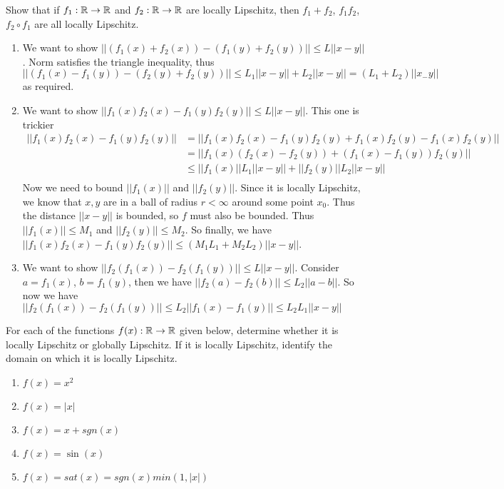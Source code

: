 \documentclass[11pt]{article}
\begin{document}
Show that if $f_1: \mathbb{R} \to \mathbb{R}$ and $f_2: \mathbb{R} \to \mathbb{R}$ are locally Lipschitz,
then $f_1 + f_2$, $f_1 f_2$, $f_2 \circ f_1$ are all locally Lipschitz.

\soln



\begin{enumerate}
    \item We want to show $||(f_1(x) + f_2(x)) - (f_1(y) + f_2(y))|| \leq L||x - y||$.
    Norm satisfies the triangle inequality, thus \\
    $||(f_1(x) - f_1(y)) - (f_2(y) + f_2(y))|| \leq  L_1||x - y|| + L_2||x - y|| = (L_1 + L_2)||x_ - y||$ as required.
    \item We want to show $||f_1(x)f_2(x) - f_1(y)f_2(y)|| \leq L||x - y||$.
    This one is trickier
    \begin{align*}
        ||f_1(x)f_2(x) - f_1(y)f_2(y)|| &= ||f_1(x)f_2(x) - f_1(y)f_2(y) + f_1(x)f_2(y) - f_1(x)f_2(y)||\\
        &= ||f_1(x)(f_2(x) - f_2(y)) + (f_1(x) - f_1(y))f_2(y) || \\
        &\leq ||f_1(x)|| L_1| |x - y|| + ||f_2(y)|| L_2 ||x - y||\\
    \end{align*} 
    Now we need to bound $||f_1(x)||$ and $||f_2(y)||$.
    Since it is locally Lipschitz, we know that $x,y$ are in a ball of radius $r< \infty$ around some point $x_0$.
    Thus the distance $||x-y||$ is bounded, so $f$ must also be bounded.
    Thus $||f_1(x)|| \leq M_1$ and $||f_2(y)|| \leq M_2$.
    So finally, we have $||f_1(x)f_2(x) - f_1(y)f_2(y)|| \leq (M_1L_1 + M_2L_2)||x - y||$.
    \item We want to show $||f_2(f_1(x)) - f_2(f_1(y))|| \leq L||x - y||$.
    Consider $a = f_1(x)$, $b = f_1(y)$, then we have $||f_2(a) - f_2(b)|| \leq L_2||a - b||$.
    So now we have $||f_2(f_1(x)) - f_2(f_1(y))|| \leq L_2 ||f_1(x) - f_1(y)|| \leq L_2L_1||x-y||$
\end{enumerate}



For each of the functions $f(x): \mathbb{R} \to \mathbb{R}$ given below, determine whether it is
locally Lipschitz or globally Lipschitz. If it is locally Lipschitz, identify the domain on which
it is locally Lipschitz.

\begin{enumerate}
    \item $f(x) = x^2$
    \item $f(x) = |x|$
    \item $f(x) = x + sgn(x)$
    \item $f(x) = \sin(x)$
    \item $f(x) = sat(x) = sgn(x) min(1, |x|)$
\end{enumerate}
\end{document}
